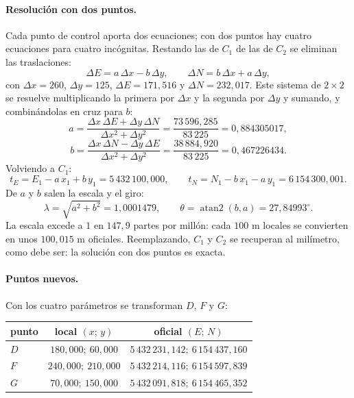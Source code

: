 \paragraph{Resolución con dos puntos.} Cada punto de control aporta dos ecuaciones; con dos
puntos hay cuatro ecuaciones para cuatro incógnitas. Restando las de \(C_1\) de las de \(C_2\)
se eliminan las traslaciones:
\[
  \Delta E=a\,\Delta x-b\,\Delta y,\qquad \Delta N=b\,\Delta x+a\,\Delta y,
\]
con \(\Delta x=260\), \(\Delta y=125\), \(\Delta E=171{,}516\) y \(\Delta N=232{,}017\). Este
sistema de \(2\times2\) se resuelve multiplicando la primera por \(\Delta x\) y la segunda por
\(\Delta y\) y sumando, y combinándolas en cruz para \(b\):
\[
  a=\frac{\Delta x\,\Delta E+\Delta y\,\Delta N}{\Delta x^2+\Delta y^2}
   =\frac{73\,596{,}285}{83\,225}=0{,}884305017,
\]
\[
  b=\frac{\Delta x\,\Delta N-\Delta y\,\Delta E}{\Delta x^2+\Delta y^2}
   =\frac{38\,884{,}920}{83\,225}=0{,}467226434.
\]
Volviendo a \(C_1\):
\[
  t_E=E_1-a\,x_1+b\,y_1=5\,432\,100{,}000,\qquad
  t_N=N_1-b\,x_1-a\,y_1=6\,154\,300{,}001 .
\]
De \(a\) y \(b\) salen la escala y el giro:
\[
  \lambda=\sqrt{a^2+b^2}=1{,}0001479,\qquad
  \theta=\operatorname{atan2}(b,a)=27{,}84993^\circ .
\]
La escala excede a \(1\) en \(147{,}9\) partes por millón: cada \(100\) m locales se convierten en
unos \(100{,}015\) m oficiales. Reemplazando, \(C_1\) y \(C_2\) se recuperan al milímetro, como
debe ser: la solución con dos puntos es exacta.

\paragraph{Puntos nuevos.} Con los cuatro parámetros se transforman \(D\), \(F\) y \(G\):
\begin{center}
\begin{tabular}{lcc}
\toprule
punto & local \((x;\,y)\) & oficial \((E;\,N)\)\\
\midrule
\(D\) & \(180{,}000;\ 60{,}000\) & \(5\,432\,231{,}142;\ 6\,154\,437{,}160\)\\
\(F\) & \(240{,}000;\ 210{,}000\) & \(5\,432\,214{,}116;\ 6\,154\,597{,}839\)\\
\(G\) & \(70{,}000;\ 150{,}000\) & \(5\,432\,091{,}818;\ 6\,154\,465{,}352\)\\
\bottomrule
\end{tabular}
\end{center}

